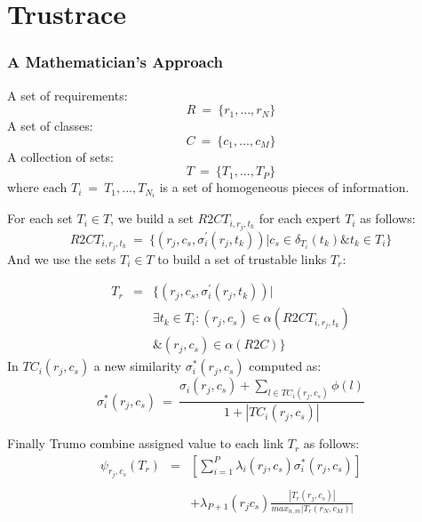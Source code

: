 \documentclass[12pt,hyperref=true,mathserif]{beamer}
\begin{document}
\section{Trustrace}
\begin{frame}
\frametitle{A Mathematician's Approach}
A set of requirements:
\begin{equation}\label{equ:Requirements}
  R~=~\{r_{1},...,r_{N}\}
\end{equation}
A set of classes:
\begin{equation}\label{equ:Classes}
  C~=~\{c_{1},...,c_{M}\}
\end{equation}
A collection of sets:
\begin{equation}\label{equ:Sets}
  T~=~\{T_{1},...,T_{P}\}
\end{equation}
where each $T_{i}~=~{T_{1},...,T_{N_{i}}}$ is a set of homogeneous pieces of information.
\end{frame}

\begin{frame}
For each set $T_{i}\in T$, we build a set $R2CT_{i,r_{j},t_{k}}$ for each expert $T_{i}$ as follows:
\begin{equation}\label{equ:RequirementSetforExperts}
  R2CT_{i,r_{j},t_{k}}~=~\{(r_{j},c_{s},\sigma^{'}_{i}(r_{j},t_{k}))|c_{s}\in \delta_{T_{i}}(t_{k}) \& t_{k}\in T_{i}\}
\end{equation}
And we use the sets $T_{i} \in T$ to build a set of trustable links $T_{r}$:

\begin{equation}
    \begin{array}{rcl}
        T_{r} & = & \{(r_{j},c_{s},\sigma^{'}_{i}(r_{j},t_{k}))|\\
                  &  & \exists t_{k} \in T_{i}:(r_{j},c_{s})\in \alpha(R2CT_{i,r_{j},t_{k}})\\
                  &  & \&(r_{j},c_{s}) \in \alpha(R2C)\}
    \end{array}
\end{equation}
In $TC_{i}(r_{j},c_{s})$ a new similarity $\sigma^{*}_{i}(r_{j},c_{s})$ computed as:
\begin{equation}\label{equ:TrumoNewSimilarity}
  \sigma^{*}_{i}(r_{j},c_{s})~=~\frac{\sigma_{i}(r_{j},c_{s})+\sum_{l\in TC_{i}(r_{j},c_{s})}\phi(l)}{1+|TC_{i}(r_{j},c_{s})|}
\end{equation}
\end{frame}

\begin{frame}
Finally Trumo combine assigned value  to each link $T_{r}$ as follows:
\begin{equation}
    \begin{array}{rcl}
        \psi_{r_{j},c_{s}}(T_{r}) & = & [\sum_{i=1}^{P}\lambda_{i}(r_{j},c_{s})\sigma^{*}_{i}(r_{j},c_{s})]\\
        &  &  \\
                  &  & +\lambda_{P+1}(r_{j}c_{s}) \frac{|T_{r}(r_{j},c_{s})|}{max_{n,m}|T_{r}(r_{N},c_{M})|}\\

    \end{array}
\end{equation}
\end{frame}
\end{document}
